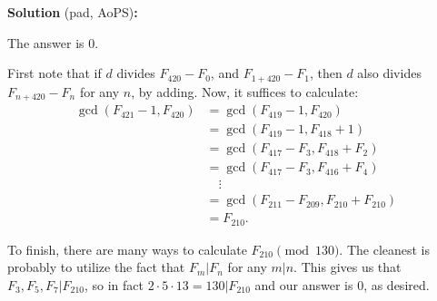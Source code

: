 
\begin{solution}
\textbf{Solution} (pad, AoPS)\textbf{:}\V

The answer is $0$.\V

First note that if $d$ divides $F_{420}-F_0$, and $F_{1+420} - F_{1}$, then 
$d$ also divides $F_{n+420}-F_n$ for any $n$, by adding. Now, it suffices to calculate:
\begin{align*}
    \gcd{(F_{421} - 1,F_{420})} &= \gcd{(F_{419} - 1,F_{420})} \\
    &= \gcd{(F_{419} - 1,F_{418}+1)} \\
    &= \gcd{(F_{417} - F_3,F_{418}+F_2)} \\
    &= \gcd{(F_{417} - F_3,F_{416}+F_4)} \\
    &\quad\vdots \\
    &= \gcd{(F_{211}-F_{209}, F_{210} + F_{210})}\\
    &= F_{210}.
\end{align*}

To finish, there are many ways to calculate $F_{210} \pmod{130}$. The cleanest is probably to utilize the fact that $F_m\vert F_n$ for any $m\vert n$. This gives us that $F_3,F_5,F_7\vert F_{210}$, so in fact $2\cdot 5\cdot 13 = 130\vert F_{210}$ and our answer is $0$, as desired.

\end{solution}\V
